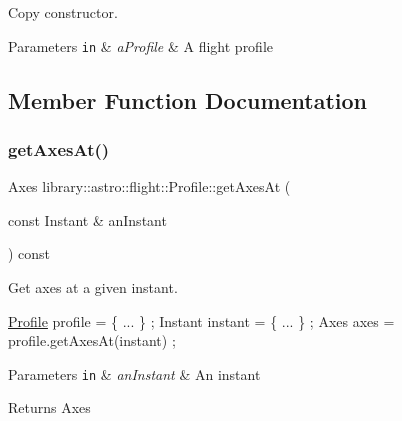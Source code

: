 Copy constructor. 


\begin{DoxyParams}[1]{Parameters}
\mbox{\tt in}  & {\em a\+Profile} & A flight profile \\
\hline
\end{DoxyParams}


\subsection{Member Function Documentation}
\mbox{\label{classlibrary_1_1astro_1_1flight_1_1_profile_ae23fce614c9d1de3a4e8800eb4e3e03f}} 
\subsubsection{\texorpdfstring{get\+Axes\+At()}{getAxesAt()}}
{\footnotesize\ttfamily Axes library\+::astro\+::flight\+::\+Profile\+::get\+Axes\+At (\begin{DoxyParamCaption}\item[{const Instant \&}]{an\+Instant }\end{DoxyParamCaption}) const}



Get axes at a given instant. 


\begin{DoxyCode}
\hyperlink{classlibrary_1_1astro_1_1flight_1_1_profile_a34d66fdddf3eda9a3fed036d6b9a4363}{Profile} profile = \{ ... \} ;
Instant instant = \{ ... \} ;
Axes axes = profile.getAxesAt(instant) ;
\end{DoxyCode}



\begin{DoxyParams}[1]{Parameters}
\mbox{\tt in}  & {\em an\+Instant} & An instant \\
\hline
\end{DoxyParams}
\begin{DoxyReturn}{Returns}
Axes 
\end{DoxyReturn}
\mbox{\label{classlibrary_1_1astro_1_1flight_1_1_profile_a7f266d44fe664c8dce12c28067ffdd94}} 
